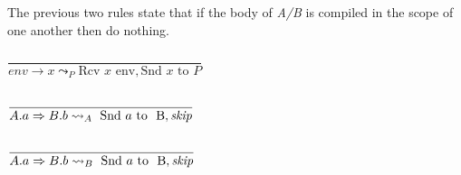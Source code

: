 The previous two rules state that if the body of \textit{A/B} is
compiled in the scope of one another then do nothing.\bigskip

\hspace*{10em} $\dfrac{
\begin{array}{l}
    \phantom{}
\end{array}
}{env \rightarrow x \leadsto_P \text{Rcv } x \text{ env}, \text{Snd } x \text{ to } P}$\bigskip

\hspace*{10em} $\dfrac{
\begin{array}{l}
    \phantom{}
\end{array}
}{A.a \Rightarrow B.b \leadsto_A \text{ Snd } a \text{ to } \text{ B}, \text{\textit{skip}}}$\bigskip

\hspace*{10em} $\dfrac{
\begin{array}{l}
    \phantom{}
\end{array}
}{A.a \Rightarrow B.b \leadsto_B \text{ Snd } a \text{ to } \text{ B}, \text{\textit{skip}}}$\bigskip
